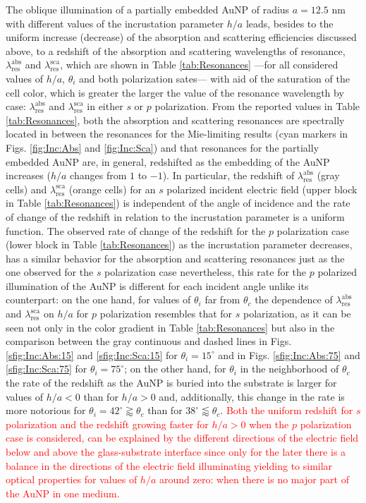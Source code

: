 The oblique illumination of a partially embedded AuNP of radius $a=12.5$ nm with different values of the incrustation parameter $h/a$ leads, besides to the uniform increase (decrease) of the absorption and scattering efficiencies discussed above, to a redshift of the absorption and scattering wavelengths of resonance, $\lambda_\text{res}^\text{abs}$ and $\lambda_\text{res}^\text{sca}$, which are shown in Table \ref{tab:Resonances} ---for all considered values of $h/a$, $\theta_i$ and both polarization sates--- with aid of the saturation of the cell color, which is greater the larger the value of the resonance wavelength by case: $\lambda_\text{res}^\text{abs}$ and $\lambda_\text{res}^\text{sca}$ in either $s$ or $p$ polarization. From the reported values in Table \ref{tab:Resonances}, both the absorption and scattering resonances are spectrally located in between the resonances for the Mie-limiting results (cyan markers in Figs. \ref{fig:Inc:Abs} and \ref{fig:Inc:Sca}) and that resonances for the partially embedded AuNP are, in general, redshifted as the embedding of the AuNP increases ($h/a$ changes from $1$ to $-1$). In particular, the redshift of $\lambda_\text{res}^\text{abs}$ (gray cells) and $\lambda_\text{res}^\text{sca}$ (orange cells) for an $s$ polarized incident electric field (upper block in Table \ref{tab:Resonances}) is independent of the angle of incidence and the rate of change of the redshift in relation to the incrustation parameter is a uniform function. The observed rate of change of the redshift for the $p$ polarization case (lower block in Table \ref{tab:Resonances}) as the incrustation parameter decreases, has a similar behavior for the absorption and scattering resonances just as the one observed for the $s$ polarization case nevertheless, this rate for the $p$ polarized illumination of the AuNP is different for each incident angle unlike its counterpart: on the one hand, for values of $\theta_i$ far from $\theta_c$ the dependence of  $\lambda_\text{res}^\text{abs}$ and $\lambda_\text{res}^\text{sca}$ on $h/a$ for $p$ polarization resembles that for $s$ polarization, as it can be seen not only in the color gradient in Table \ref{tab:Resonances} but also in the comparison between the gray continuous and dashed lines in Figs. \ref{sfig:Inc:Abs:15} and \ref{sfig:Inc:Sca:15} for $\theta_i = 15^\circ$ and in Figs. \ref{sfig:Inc:Abs:75} and \ref{sfig:Inc:Sca:75} for $\theta_i = 75^\circ$; on the other hand, for $\theta_i$ in the neighborhood of $\theta_c$ the rate of the redshift as the AuNP is buried into the substrate is larger for values of $h/a<0$ than for $h/a>0$ and, additionally, this change in the rate is more notorious for $\theta_i = 42^\circ\gtrapprox \theta_c$ than for $38^\circ\lessapprox \theta_c$. \textcolor{red}{Both the uniform redshift for $s$ polarization and the redshift growing faster for $h/a>0$ when the $p$ polarization case is considered, can be explained by the different directions of the electric field below and above the glass-substrate interface since only for the later there is a balance in the directions of the electric field illuminating yielding to similar optical properties for values of $h/a$  around zero: when there is no major part of the AuNP in one medium.}

